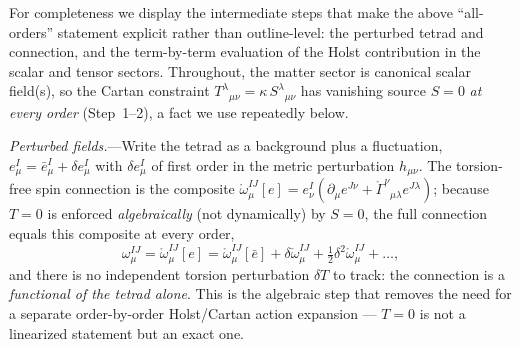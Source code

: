\documentclass[aps,prd,twocolumn,superscriptaddress,showpacs,preprintnumbers,nofootinbib,longbibliography,floatfix]{revtex4-2}
\begin{document}
For completeness we display the intermediate steps that make the
above ``all-orders'' statement explicit rather than outline-level:
the perturbed tetrad and connection, and the term-by-term evaluation
of the Holst contribution in the scalar and tensor sectors. Throughout,
the matter sector is canonical scalar field(s), so the Cartan constraint
$T^\lambda{}_{\mu\nu}=\kappa\,S^\lambda{}_{\mu\nu}$ has vanishing source
$S=0$ \emph{at every order} (Step~1--2), a fact we use repeatedly below.

\textit{Perturbed fields.}---Write the tetrad as a background plus a
fluctuation, $e^I_\mu=\bar e^I_\mu+\delta e^I_\mu$ with $\delta e^I_\mu$
of first order in the metric perturbation $h_{\mu\nu}$. The torsion-free
spin connection is the composite
$\mathring\omega^{IJ}_\mu[e]=e^I_\nu(\partial_\mu e^{J\nu}
+\mathring\Gamma^\nu{}_{\mu\lambda}e^{J\lambda})$; because $T=0$ is enforced
\emph{algebraically} (not dynamically) by $S=0$, the full connection equals
this composite at every order,
\begin{equation}
\omega^{IJ}_\mu = \mathring\omega^{IJ}_\mu[e]
=\mathring\omega^{IJ}_\mu[\bar e]
+\delta\mathring\omega^{IJ}_\mu+\tfrac12\delta^2\mathring\omega^{IJ}_\mu+\dots,
\label{eq:pert_conn}
\end{equation}
and there is no independent torsion perturbation $\delta T$ to track: the
connection is a \emph{functional of the tetrad alone}. This is the algebraic
step that removes the need for a separate order-by-order Holst/Cartan action
expansion --- $T=0$ is not a linearized statement but an exact one.
\end{document}
